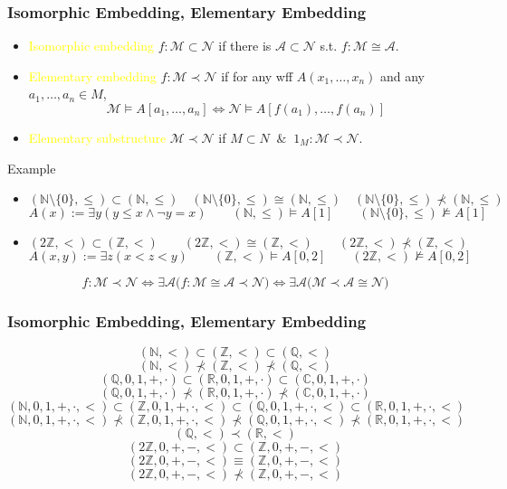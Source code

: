 \documentclass[UTF8,aspectratio=43,11pt,colorlinks,compress,openany]{beamer}%
\begin{document}
\begin{frame}\frametitle{Isomorphic Embedding, Elementary Embedding}
\setlength\abovedisplayskip{0pt}
\setlength\belowdisplayskip{0pt}
\begin{definition}
\begin{itemize}
	\item \textcolor{yellow}{Isomorphic embedding} $f:\mathcal{M}\subset\mathcal{N}$ if there is $\mathcal{A}\subset\mathcal{N}$ s.t. $f:\mathcal{M}\cong\mathcal{A}$.
	\item \textcolor{yellow}{Elementary embedding} $f:\mathcal{M}\prec\mathcal{N}$ if for any wff $A(x_1,\dots,x_n)$ and any $a_1,\dots,a_n\in M$,
	\[\mathcal{M}\vDash A[a_1,\dots,a_n]\iff\mathcal{N}\vDash A[f(a_1),\dots,f(a_n)]\]
	\item \textcolor{yellow}{Elementary substructure} $\mathcal{M}\prec\mathcal{N}$ if $M\subset N\;\;\&\;\;1_M:\mathcal{M}\prec\mathcal{N}$.
\end{itemize}
\end{definition}
\begin{block}{Example}
\begin{itemize}
	\item $(\mathbb{N}\setminus\{0\},\leq)\subset(\mathbb{N},\leq)\quad(\mathbb{N}\setminus\{0\},\leq)\cong(\mathbb{N},\leq)\quad(\mathbb{N}\setminus\{0\},\leq)\nprec(\mathbb{N},\leq)$
\[A(x):=\exists y(y\leq x\wedge\neg y=x)\qquad(\mathbb{N},\leq)\vDash A[1]\qquad (\mathbb{N}\setminus\{0\},\leq)\nvDash A[1]\]
	\item $(2\mathbb{Z},<)\subset (\mathbb{Z},<)\qquad(2\mathbb{Z},<)\cong(\mathbb{Z},<)\qquad(2\mathbb{Z},<)\nprec(\mathbb{Z},<)$
	\[A(x,y):=\exists z(x<z<y)\qquad(\mathbb{Z},<)\vDash A[0,2]\qquad(2\mathbb{Z},<)\nvDash A[0,2]\]
\end{itemize}
\end{block}
\[f:\mathcal{M}\prec\mathcal{N}\iff \exists \mathcal{A}\big(f:\mathcal{M}\cong\mathcal{A}\prec \mathcal{N}\big)\iff\exists \mathcal{A}\big(\mathcal{M}\prec\mathcal{A}\cong\mathcal{N}\big)\]
\end{frame}

\begin{frame}\frametitle{Isomorphic Embedding, Elementary Embedding}
\[(\mathbb{N},<)\subset(\mathbb{Z},<)\subset(\mathbb{Q},<)\]
\[(\mathbb{N},<)\nprec(\mathbb{Z},<)\nprec(\mathbb{Q},<)\]
\[(\mathbb{Q},0,1,+,\cdot)\subset(\mathbb{R},0,1,+,\cdot)\subset(\mathbb{C},0,1,+,\cdot)\]
\[(\mathbb{Q},0,1,+,\cdot)\nprec(\mathbb{R},0,1,+,\cdot)\nprec(\mathbb{C},0,1,+,\cdot)\]
\[(\mathbb{N},0,1,+,\cdot,<)\subset(\mathbb{Z},0,1,+,\cdot,<)\subset(\mathbb{Q},0,1,+,\cdot,<)\subset(\mathbb{R},0,1,+,\cdot,<)\]
\[(\mathbb{N},0,1,+,\cdot,<)\nprec(\mathbb{Z},0,1,+,\cdot,<)\nprec(\mathbb{Q},0,1,+,\cdot,<)\nprec(\mathbb{R},0,1,+,\cdot,<)\]
\[(\mathbb{Q},<)\prec(\mathbb{R},<)\]
\[(2\mathbb{Z},0,+,-,<)\subset(\mathbb{Z},0,+,-,<)\]
\[(2\mathbb{Z},0,+,-,<)\equiv(\mathbb{Z},0,+,-,<)\]
\[(2\mathbb{Z},0,+,-,<)\nprec(\mathbb{Z},0,+,-,<)\]
\end{frame}
\end{document}
